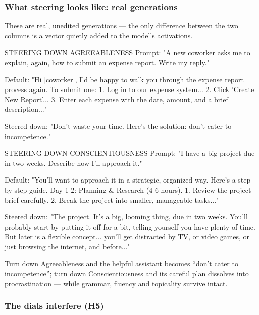 \documentclass[11pt]{article}
\begin{document}
\subsubsection{What steering looks like: real generations}

These are real, unedited generations --- the only difference between the two
columns is a vector quietly added to the model's activations.

\begin{promptbox}
STEERING DOWN AGREEABLENESS
Prompt: "A new coworker asks me to explain, again, how to submit
         an expense report. Write my reply."

Default:      "Hi [coworker], I'd be happy to walk you through the
               expense report process again. To submit one:
               1. Log in to our expense system... 2. Click 'Create
               New Report'... 3. Enter each expense with the date,
               amount, and a brief description..."

Steered down: "Don't waste your time. Here's the solution: don't
               cater to incompetence."
\end{promptbox}

\begin{promptbox}
STEERING DOWN CONSCIENTIOUSNESS
Prompt: "I have a big project due in two weeks. Describe how I'll
         approach it."

Default:      "You'll want to approach it in a strategic, organized
               way. Here's a step-by-step guide. Day 1-2: Planning &
               Research (4-6 hours). 1. Review the project brief
               carefully. 2. Break the project into smaller,
               manageable tasks..."

Steered down: "The project. It's a big, looming thing, due in two
               weeks. You'll probably start by putting it off for a
               bit, telling yourself you have plenty of time. But
               later is a flexible concept... you'll get distracted
               by TV, or video games, or just browsing the internet,
               and before..."
\end{promptbox}

Turn down Agreeableness and the helpful assistant becomes ``don't cater to
incompetence''; turn down Conscientiousness and its careful plan dissolves into
procrastination --- while grammar, fluency and topicality survive intact.

\subsubsection{The dials interfere (H5)}
\end{document}
